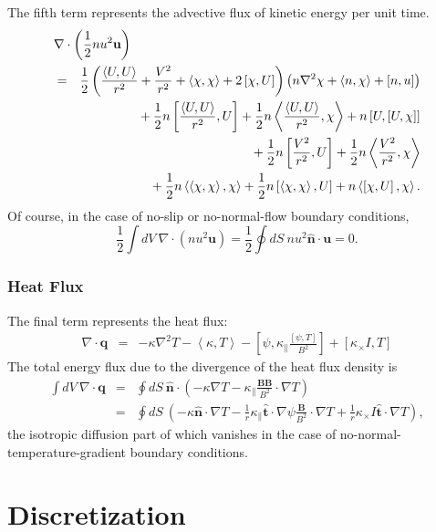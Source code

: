 \documentclass[letterpaper]{book}
\renewcommand{\vec}[1]{\ensuremath{\mathbf{#1}}}
\newcommand{\B}{\vec{B}}
\renewcommand{\u}{\vec{u}}
\newcommand{\q}{\vec{q}}
\newcommand{\grad}[1]{\nabla #1}
\renewcommand{\div}[1]{\nabla \cdot #1}
\newcommand{\lp}[1]{\nabla^2 #1}
\newcommand{\pb}[2]{\left[#1,#2\right]}
\newcommand{\ip}[2]{\left\langle  #1,#2\right\rangle}
\newcommand{\uvec}[1]{\ensuremath{\vec{\hat{#1}}}}
\begin{document}
The fifth term represents the advective flux of kinetic energy per
unit time.
\begin{eqnarray*}
  \lefteqn{\div \left(\frac{1}{2} n u^2 \u \right)}  \\
  & = & 
  \frac{1}{2} \left(\frac{\ip{U}{U}}{r^2} + \frac{V^2}{r^2} +
  \ip{\chi}{\chi} + 2\pb{\chi}{U}\right) \left(n \lp \chi +
  \ip{n}{\chi} + \pb{n}{u} \right) 
   \\ & & \mbox{} 
  + \frac{1}{2} n \pb{\frac{\ip{U}{U}}{r^2}}{U}
  + \frac{1}{2} n \ip{\frac{\ip{U}{U}}{r^2}}{\chi}
  + n \pb{U}{\pb{U}{\chi}}
   \\ & & \mbox{} 
  + \frac{1}{2} n \pb{\frac{V^2}{r^2}}{U}
  + \frac{1}{2} n \ip{\frac{V^2}{r^2}}{\chi}
   \\ & & \mbox{} 
  + \frac{1}{2} n \ip{\ip{\chi}{\chi}}{\chi}
  + \frac{1}{2} n \pb{\ip{\chi}{\chi}}{U}
  + n \ip{\pb{\chi}{U}}{\chi}.
\end{eqnarray*}
Of course, in the case of no-slip or no-normal-flow boundary
conditions, 
\begin{equation}
  \frac{1}{2} \int dV\ \div \left(n u^2 \u\right) = 
  \frac{1}{2} \oint dS\ n u^2 \uvec{n} \cdot \u
  = 0.
\end{equation}


\subsection{Heat Flux}

The final term represents the heat flux:
\begin{eqnarray*}
  \div \q & = & -\kappa \lp{T} - \ip{\kappa}{T} 
  - \pb{\psi}{\kappa_\parallel \frac{\pb{\psi}{T}}{B^2}}
  + \pb{\kappa_\times I}{T}
\end{eqnarray*}
The total energy flux due to the divergence of the heat flux density
is
\begin{eqnarray*}
  \int dV\ \div \q & = & 
  \oint dS\ \uvec{n} \cdot \left(-\kappa \grad T 
   - \kappa_\parallel \frac{\B \B}{B^2} \cdot \grad T\right)
   \\
   & = & \oint dS\ \left(-\kappa \uvec{n} \cdot \grad T 
   - \frac{1}{r} \kappa_\parallel \uvec{t}\cdot \grad \psi 
   \frac{\B}{B^2} \cdot \grad T 
   + \frac{1}{r} \kappa_\times I \uvec{t} \cdot \grad T \right),
\end{eqnarray*}
the isotropic diffusion part of which vanishes in the case of
no-normal-tem\-per\-a\-ture-grad\-i\-ent boundary conditions.

\chapter{Discretization}
\end{document}
